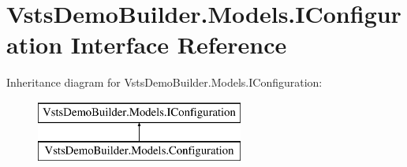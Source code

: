 \hypertarget{interface_vsts_demo_builder_1_1_models_1_1_i_configuration}{}\section{Vsts\+Demo\+Builder.\+Models.\+I\+Configuration Interface Reference}
\label{interface_vsts_demo_builder_1_1_models_1_1_i_configuration}
Inheritance diagram for Vsts\+Demo\+Builder.\+Models.\+I\+Configuration\+:\begin{figure}[H]
\begin{center}
\leavevmode
\includegraphics[height=2.000000cm]{interface_vsts_demo_builder_1_1_models_1_1_i_configuration}
\end{center}
\end{figure}
